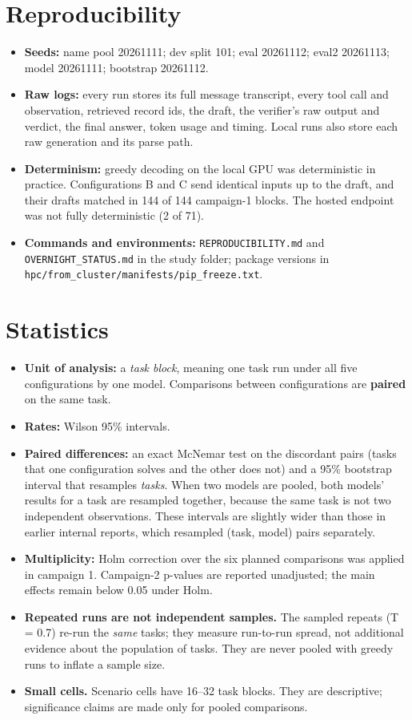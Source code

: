 \documentclass[10.5pt,a4paper,oneside]{report}
\begin{document}
\section{Reproducibility}
\begin{itemize}
\item \textbf{Seeds:} name pool 20261111; dev split 101; eval 20261112; eval2 20261113; model 20261111; bootstrap 20261112.
\item \textbf{Raw logs:} every run stores its full message transcript, every tool call and observation, retrieved record ids, the draft, the verifier's raw output and verdict, the final answer, token usage and timing. Local runs also store each raw generation and its parse path.
\item \textbf{Determinism:} greedy decoding on the local GPU was deterministic in practice. Configurations B and C send identical inputs up to the draft, and their drafts matched in 144 of 144 campaign-1 blocks. The hosted endpoint was not fully deterministic (2 of 71).
\item \textbf{Commands and environments:} \texttt{REPRODUCIBILITY.\allowbreak{}md} and \texttt{OVERNIGHT\_\allowbreak{}STATUS.\allowbreak{}md} in the study folder; package versions in \texttt{hpc/\allowbreak{}from\_\allowbreak{}cluster/\allowbreak{}manifests/\allowbreak{}pip\_\allowbreak{}freeze.\allowbreak{}txt}.
\end{itemize}
\section{Statistics}
\begin{itemize}
\item \textbf{Unit of analysis:} a \emph{task block}, meaning one task run under all five configurations by one model. Comparisons between configurations are \textbf{paired} on the same task.
\item \textbf{Rates:} Wilson 95\% intervals.
\item \textbf{Paired differences:} an exact McNemar test on the discordant pairs (tasks that one configuration solves and the other does not) and a 95\% bootstrap interval that resamples \emph{tasks}. When two models are pooled, both models' results for a task are resampled together, because the same task is not two independent observations. These intervals are slightly wider than those in earlier internal reports, which resampled (task, model) pairs separately.
\item \textbf{Multiplicity:} Holm correction over the six planned comparisons was applied in campaign 1. Campaign-2 p-values are reported unadjusted; the main effects remain below 0.05 under Holm.
\item \textbf{Repeated runs are not independent samples.} The sampled repeats (T = 0.7) re-run the \emph{same} tasks; they measure run-to-run spread, not additional evidence about the population of tasks. They are never pooled with greedy runs to inflate a sample size.
\item \textbf{Small cells.} Scenario cells have 16–32 task blocks. They are descriptive; significance claims are made only for pooled comparisons.
\end{itemize}
\clearpage
\end{document}
